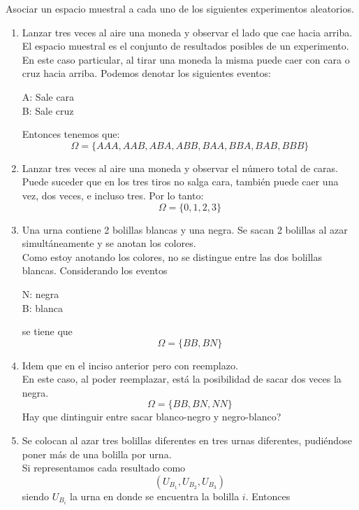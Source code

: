 \item Asociar un espacio muestral a cada uno de los siguientes experimentos aleatorios.
    \begin{enumerate}
        \item Lanzar tres veces al aire una moneda y observar el lado que cae hacia arriba.\e\\
            El espacio muestral es el conjunto de resultados posibles de un experimento. En este caso particular, al tirar una moneda la misma puede caer con cara o cruz hacia arriba. Podemos denotar los siguientes eventos:
            \begin{center}
                A: Sale cara\\
                B: Sale cruz
            \end{center}
            Entonces tenemos que:\[\Omega=\{AAA,AAB,ABA,ABB,BAA,BBA,BAB,BBB\}\]
        \item Lanzar tres veces al aire una moneda y observar el número total de caras.\e\\
            Puede suceder que en los tres tiros no salga cara, también puede caer una vez, dos veces, e incluso tres. Por lo tanto:\[\Omega=\{0,1,2,3\}\]
        \item Una urna contiene 2 bolillas blancas y una negra. Se sacan 2 bolillas al azar simultáneamente y se anotan los colores.\e\\
            Como estoy anotando los colores, no se distingue entre las dos bolillas blancas. Considerando los eventos
            \begin{center}
                N: negra\\
                B: blanca
            \end{center}
            se tiene que\[\Omega=\{BB,BN\}\]
        \item Idem que en el inciso anterior pero con reemplazo.\e\\
            En este caso, al poder reemplazar, está la posibilidad de sacar dos veces la negra.\[\Omega=\{BB,BN,NN\}\]
            Hay que dintinguir entre sacar blanco-negro y negro-blanco?
        \item Se colocan al azar tres bolillas diferentes en tres urnas diferentes, pudiéndose poner más de una bolilla por urna.\e\\
            Si representamos cada resultado como \[(U_{B_1},U_{B_2},U_{B_3})\]
            siendo $U_{B_i}$ la urna en donde se encuentra la bolilla $i$. Entonces
            \begin{center}

\end{center}
\end{enumerate}
